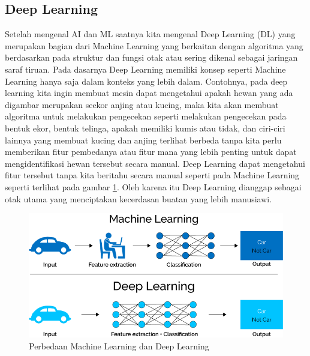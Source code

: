 \subsection{Deep Learning}
Setelah mengenal AI dan ML saatnya kita mengenal Deep Learning (DL) yang merupakan bagian dari Machine Learning yang berkaitan dengan algoritma yang berdasarkan pada struktur dan fungsi otak atau sering dikenal sebagai jaringan saraf tiruan. Pada dasarnya Deep Learning memiliki konsep seperti Machine Learning hanya saja dalam konteks yang lebih dalam. Contohnya, pada deep learning kita ingin membuat mesin dapat mengetahui apakah hewan yang ada digambar merupakan seekor anjing atau kucing, maka kita akan membuat algoritma untuk melakukan pengecekan seperti melakukan pengecekan pada bentuk ekor, bentuk telinga, apakah memiliki kumis atau tidak, dan ciri-ciri lainnya yang membuat kucing dan anjing terlihat berbeda tanpa kita perlu memberikan fitur pembedanya atau fitur mana yang lebih penting untuk dapat mengidentifikasi hewan tersebut secara manual. Deep Learning dapat mengetahui fitur tersebut tanpa kita beritahu secara manual seperti pada Machine Learning seperti terlihat pada gambar \ref{deep learning}. Oleh karena itu Deep Learning dianggap sebagai otak utama yang menciptakan kecerdasan buatan yang lebih manusiawi.
\begin{figure}[H]
        \centerline{\includegraphics[scale=.45]{figures/deeplearning}}
        \caption{Perbedaan Machine Learning dan Deep Learning}
		\label{deep learning}
\end{figure}

